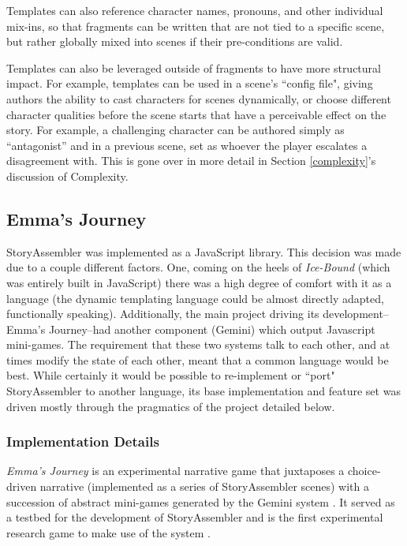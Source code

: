 Templates can also reference character names, pronouns, and other individual mix-ins, so that fragments can be written that are not tied to a specific scene, but rather globally mixed into scenes if their pre-conditions are valid. 

Templates can also be leveraged outside of fragments to have more structural impact. For example, templates can be used in a scene's ``config file", giving authors the ability to cast characters for scenes dynamically, or choose different character qualities before the scene starts that have a perceivable effect on the story. For example, a challenging character can be authored simply as ``antagonist'' and in a previous scene, set as whoever the player escalates a disagreement with. This is gone over in more detail in Section \ref{complexity}'s discussion of Complexity.

\subsection{Emma's Journey}

StoryAssembler was implemented as a JavaScript library. This decision was made due to a couple different factors. One, coming on the heels of \textit{Ice-Bound} (which was entirely built in JavaScript) there was a high degree of comfort with it as a language (the dynamic templating language could be almost directly adapted, functionally speaking). Additionally, the main project driving its development--Emma's Journey--had another component (Gemini) which output Javascript mini-games. The requirement that these two systems talk to each other, and at times modify the state of each other, meant that a common language would be best. While certainly it would be possible to re-implement or ``port" StoryAssembler to another language, its base implementation and feature set was driven mostly through the pragmatics of the project detailed below.

\subsubsection{Implementation Details}
\label{implementation-details}

\textit{Emma’s Journey} is an experimental narrative game that juxtaposes a choice-driven narrative (implemented as a series of StoryAssembler scenes) with a succession of abstract mini-games generated by the Gemini system \cite{Gemini}. It served as a testbed for the development of StoryAssembler and is the first experimental research game to make use of the system \cite{emmaWorkshop}. 

